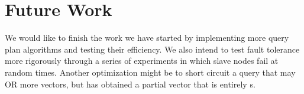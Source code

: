 \section{Future Work}
We would like to finish the work we have started by implementing more
query plan algorithms and testing their efficiency. We also intend to test
fault tolerance more rigorously through a series of experiments in which
slave nodes fail at random times. Another optimization might be to short circuit
a query that may OR more vectors, but has obtained a partial vector that
is entirely s.
